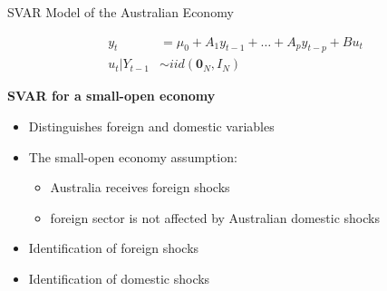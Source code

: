 \documentclass[notes,blackandwhite,mathsans,usenames,dvipsnames]{beamer}
\begin{document}
\begin{frame}{SVAR Model of the Australian Economy}

\begin{align*}
y_t &= \mu_0 + A_1y_{t-1}+ \dots + A_py_{t-p} + Bu_t\\
u_t|Y_{t-1} &\sim iid(\mathbf{0}_N,I_N)
\end{align*}


\bigskip\textbf{SVAR for a small-open economy}
\begin{itemize}[label=\textbullet,leftmargin = *]
\item {\color{mcxs2}Distinguishes foreign and domestic variables}
\item {\color{mcxs2}The} {\color{purple}small-open economy} {\color{mcxs2}assumption:}
	\begin{itemize}[label=\textbullet,leftmargin = 0.5cm]
	\item {\color{mcxs2}Australia receives foreign shocks}
	\item {\color{mcxs2}foreign sector is not affected by Australian domestic shocks}
	\end{itemize}
\item {\color{mcxs2}Identification of foreign shocks}
\item {\color{mcxs2}Identification of domestic shocks}
\end{itemize}

\end{frame}
\end{document}
